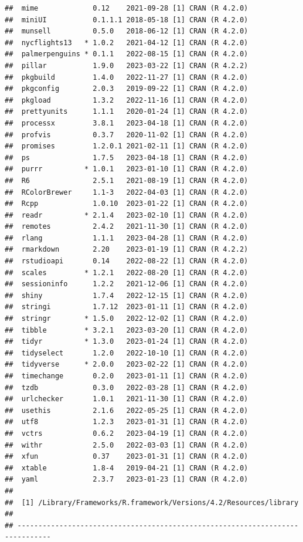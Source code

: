 \documentclass[print]{nuthesis}
\begin{document}
\begin{verbatim}
##  mime             0.12    2021-09-28 [1] CRAN (R 4.2.0)
##  miniUI           0.1.1.1 2018-05-18 [1] CRAN (R 4.2.0)
##  munsell          0.5.0   2018-06-12 [1] CRAN (R 4.2.0)
##  nycflights13   * 1.0.2   2021-04-12 [1] CRAN (R 4.2.0)
##  palmerpenguins * 0.1.1   2022-08-15 [1] CRAN (R 4.2.0)
##  pillar           1.9.0   2023-03-22 [1] CRAN (R 4.2.2)
##  pkgbuild         1.4.0   2022-11-27 [1] CRAN (R 4.2.0)
##  pkgconfig        2.0.3   2019-09-22 [1] CRAN (R 4.2.0)
##  pkgload          1.3.2   2022-11-16 [1] CRAN (R 4.2.0)
##  prettyunits      1.1.1   2020-01-24 [1] CRAN (R 4.2.0)
##  processx         3.8.1   2023-04-18 [1] CRAN (R 4.2.0)
##  profvis          0.3.7   2020-11-02 [1] CRAN (R 4.2.0)
##  promises         1.2.0.1 2021-02-11 [1] CRAN (R 4.2.0)
##  ps               1.7.5   2023-04-18 [1] CRAN (R 4.2.0)
##  purrr          * 1.0.1   2023-01-10 [1] CRAN (R 4.2.0)
##  R6               2.5.1   2021-08-19 [1] CRAN (R 4.2.0)
##  RColorBrewer     1.1-3   2022-04-03 [1] CRAN (R 4.2.0)
##  Rcpp             1.0.10  2023-01-22 [1] CRAN (R 4.2.0)
##  readr          * 2.1.4   2023-02-10 [1] CRAN (R 4.2.0)
##  remotes          2.4.2   2021-11-30 [1] CRAN (R 4.2.0)
##  rlang            1.1.1   2023-04-28 [1] CRAN (R 4.2.0)
##  rmarkdown        2.20    2023-01-19 [1] CRAN (R 4.2.2)
##  rstudioapi       0.14    2022-08-22 [1] CRAN (R 4.2.0)
##  scales         * 1.2.1   2022-08-20 [1] CRAN (R 4.2.0)
##  sessioninfo      1.2.2   2021-12-06 [1] CRAN (R 4.2.0)
##  shiny            1.7.4   2022-12-15 [1] CRAN (R 4.2.0)
##  stringi          1.7.12  2023-01-11 [1] CRAN (R 4.2.0)
##  stringr        * 1.5.0   2022-12-02 [1] CRAN (R 4.2.0)
##  tibble         * 3.2.1   2023-03-20 [1] CRAN (R 4.2.0)
##  tidyr          * 1.3.0   2023-01-24 [1] CRAN (R 4.2.0)
##  tidyselect       1.2.0   2022-10-10 [1] CRAN (R 4.2.0)
##  tidyverse      * 2.0.0   2023-02-22 [1] CRAN (R 4.2.0)
##  timechange       0.2.0   2023-01-11 [1] CRAN (R 4.2.0)
##  tzdb             0.3.0   2022-03-28 [1] CRAN (R 4.2.0)
##  urlchecker       1.0.1   2021-11-30 [1] CRAN (R 4.2.0)
##  usethis          2.1.6   2022-05-25 [1] CRAN (R 4.2.0)
##  utf8             1.2.3   2023-01-31 [1] CRAN (R 4.2.0)
##  vctrs            0.6.2   2023-04-19 [1] CRAN (R 4.2.0)
##  withr            2.5.0   2022-03-03 [1] CRAN (R 4.2.0)
##  xfun             0.37    2023-01-31 [1] CRAN (R 4.2.0)
##  xtable           1.8-4   2019-04-21 [1] CRAN (R 4.2.0)
##  yaml             2.3.7   2023-01-23 [1] CRAN (R 4.2.0)
## 
##  [1] /Library/Frameworks/R.framework/Versions/4.2/Resources/library
## 
## ------------------------------------------------------------------------------
\end{verbatim}
\end{document}
